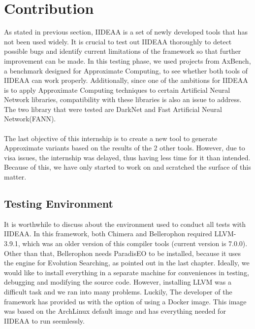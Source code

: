 \chapter{Contribution}

As stated in previous section, IIDEAA is a set of newly developed tools that has not been used widely. It is crucial to test out IIDEAA thoroughly to detect possible bugs and identify current limitations of the framework so that further improvement can be made. In this testing phase, we used projects from AxBench, a benchmark designed for Approximate Computing, to see whether both tools of IIDEAA can work properly. Additionally, since one of the ambitions for IIDEAA is to apply Approximate Computing techniques to certain Artificial Neural Network libraries, compatibility with these libraries is also an issue to address. The two library that were tested are DarkNet and Fast Artificial Neural Network(FANN). \\
~\\
The last objective of this internship is to create a new tool to generate Approximate variants based on the results of the 2 other tools. However, due to visa issues, the internship was delayed, thus having less time for it than intended. Because of this, we have only started to work on and scratched the surface of this matter.\\

\section{Testing Environment}

It is worthwhile to discuss about the environment used to conduct all tests with IIDEAA. In this framework, both Chimera and Bellerophon required LLVM-3.9.1, which was an older version of this compiler tools (current version is 7.0.0). Other than that, Bellerophon needs ParadisEO to be installed, because it uses the engine for Evolution Searching, as pointed out in the last chapter. Ideally, we would like to install everything in a separate machine for conveniences in testing, debugging and modifying the source code. However, installing LLVM was a difficult task and we ran into many problems. Luckily, The developer of the framework has provided us with the option of using a Docker image. This image was based on the ArchLinux default image and has everything needed for IIDEAA to run seemlessly.\\
\vspace*{3cm}

